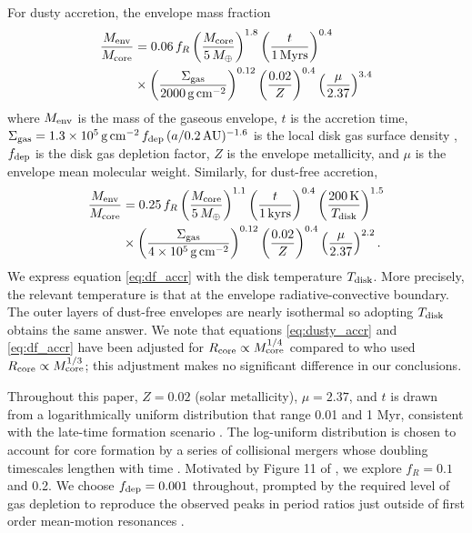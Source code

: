 \documentclass[twocolumn]{aastex63}
\begin{document}
For dusty accretion, the envelope mass fraction
%
\begin{align}
    \frac{M_{\rm env}}{M_{\rm core}} &= 0.06\,f_R\left(\frac{M_{\rm core}}{5\,M_\oplus}\right)^{1.8}\left(\frac{t}{1\,{\rm Myrs}}\right)^{0.4} \nonumber \\
    & \times \left(\frac{\Sigma_{\rm gas}}{2000\,{\rm g}\,{\rm cm}^{-2}}\right)^{0.12}\left(\frac{0.02}{Z}\right)^{0.4}\left(\frac{\mu}{2.37}\right)^{3.4}
    \label{eq:dusty_accr}
\end{align}
%
where $M_{\rm env}$ is the mass of the gaseous envelope, $t$ is the accretion time, $\Sigma_{\rm gas} = 1.3\times 10^5\,{\rm g}\,{\rm cm}^{-2}\,f_{\rm dep}\,(a/0.2\,{\rm AU})^{-1.6}$ is the local disk gas surface density \citep{Chiang13}, $f_{\rm dep}$ is the disk gas depletion factor, $Z$ is the envelope metallicity, and $\mu$ is the envelope mean molecular weight. Similarly, for dust-free accretion,
%
\begin{align}
    \frac{M_{\rm env}}{M_{\rm core}} &= 0.25\,f_R\left(\frac{M_{\rm core}}{5\,M_\oplus}\right)^{1.1}\left(\frac{t}{1\,{\rm kyrs}}\right)^{0.4} \left(\frac{200\,{\rm K}}{T_{\rm disk}}\right)^{1.5} \nonumber \\
    & \times \left(\frac{\Sigma_{\rm gas}}{4\times 10^5\,{\rm g}\,{\rm cm}^{-2}}\right)^{0.12} \left(\frac{0.02}{Z}\right)^{0.4}\left(\frac{\mu}{2.37}\right)^{2.2}.
    \label{eq:df_accr}
\end{align}
%
We express equation \ref{eq:df_accr} with the disk temperature $T_{\rm disk}$. More precisely, the relevant temperature is that at the envelope radiative-convective boundary. The outer layers of dust-free envelopes are nearly isothermal so adopting $T_{\rm disk}$ obtains the same answer. We note that equations \ref{eq:dusty_accr} and \ref{eq:df_accr} have been adjusted for $R_{\rm core} \propto M_{\rm core}^{1/4}$ compared to \citet{Lee15} who used $R_{\rm core} \propto M_{\rm core}^{1/3}$; this adjustment makes no significant difference in our conclusions.

Throughout this paper, $Z=0.02$ (solar metallicity), $\mu = 2.37$, and $t$ is drawn from a logarithmically uniform distribution that range 0.01 and 1 Myr, consistent with the late-time formation scenario \citep{Lee16}. The log-uniform distribution is chosen to account for core formation by a series of collisional mergers whose doubling timescales lengthen with time \citep[e.g.,][]{Dawson15}. Motivated by Figure 11 of \citet{Fung19}, we explore $f_R = 0.1$ and 0.2. We choose $f_{\rm dep} = 0.001$ throughout, prompted by the required level of gas depletion to reproduce the observed peaks in period ratios just outside of first order mean-motion resonances \citep{Choksi20}.
\end{document}
